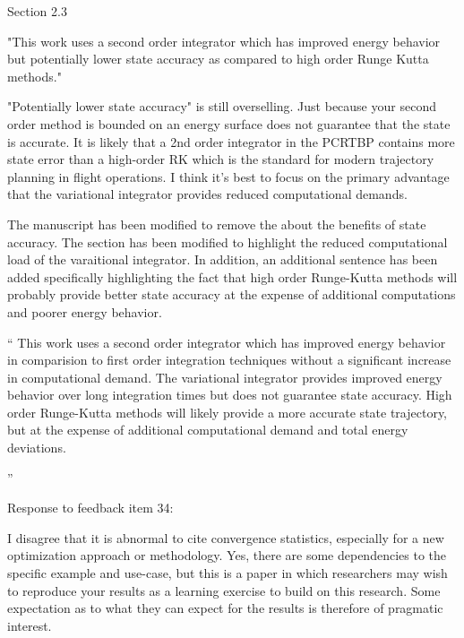 \documentclass[11pt]{article}
\newenvironment{correction}{\begin{list}{}{\setlength{\leftmargin}{1cm}\setlength{\rightmargin}{1cm}}\vspace{\parsep}\item[]``}{''\end{list}}
\begin{document}
\begin{itemize}
    \item 
        \begin{itshape}
            Section 2.3

            "This work uses a second order integrator which has improved energy behavior but potentially lower state accuracy as compared to high order Runge Kutta methods."

            "Potentially lower state accuracy" is still overselling.  Just because your second order method is bounded on an energy surface does not guarantee that the state is accurate.  It is likely that a 2nd order integrator in the PCRTBP contains more state error than a high-order RK which is the standard for modern trajectory planning in flight operations.  I think it's best to focus on the primary advantage that the variational integrator provides reduced computational demands.
        \end{itshape}
    
    The manuscript has been modified to remove the about the benefits of state accuracy.
    The section has been modified to highlight the reduced computational load of the varaitional integrator.
    In addition, an additional sentence has been added specifically highlighting the fact that high order Runge-Kutta methods will probably provide better state accuracy at the expense of additional computations and poorer energy behavior.
    
    \begin{correction}
        This work uses a second order integrator which has improved energy behavior in comparision to first order integration techniques without a significant increase in computational demand.
        The variational integrator provides improved energy behavior over long integration times but does not guarantee state accuracy.
        High order Runge-Kutta methods will likely provide a more accurate state trajectory, but at the expense of additional computational demand and total energy deviations.

    \end{correction}
    \item \begin{itshape}
            Response to feedback item 34:

            I disagree that it is abnormal to cite convergence statistics, especially for a new optimization approach or methodology.  Yes, there are some dependencies to the specific example and use-case, but this is a paper in which researchers may wish to reproduce your results as a learning exercise to build on this research.  Some expectation as to what they can expect for the results is therefore of pragmatic interest.


\end{itshape}
\end{itemize}
\end{document}
